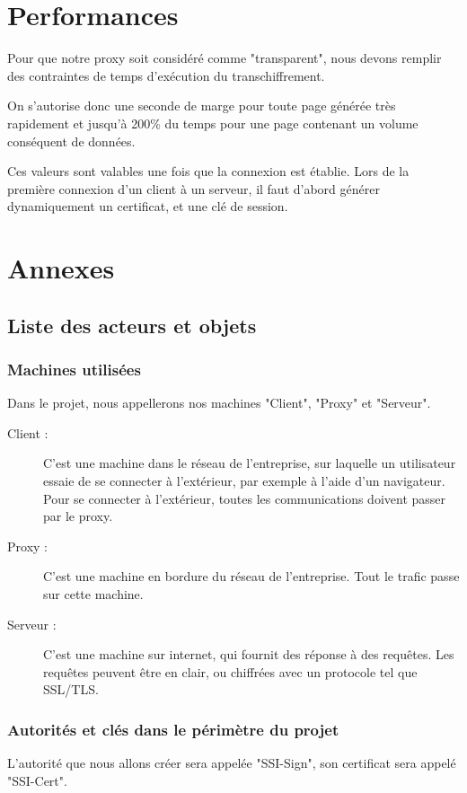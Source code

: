 \documentclass[a4paper,11pt,french]{article}
\begin{document}
\section{Performances}
Pour que notre proxy soit considéré comme "transparent", nous devons remplir des contraintes de temps d'exécution du transchiffrement.

On s'autorise donc une seconde de marge pour toute page générée très rapidement et jusqu'à 200\% du temps pour une page contenant un volume conséquent de données.

Ces valeurs sont valables une fois que la connexion est établie. Lors de la première connexion d'un client à un serveur, il faut d'abord générer dynamiquement un certificat, et une clé de session.

\newpage
\section{Annexes}


\subsection{Liste des acteurs et objets}

\subsubsection{Machines utilisées}
Dans le projet, nous appellerons nos machines "Client", "Proxy" et "Serveur".
\begin{description}
\item[Client :] C'est une machine dans le réseau de l'entreprise, sur laquelle un utilisateur essaie de se connecter à l'extérieur, par exemple à l'aide d'un navigateur. Pour se connecter à l'extérieur, toutes les communications doivent passer par le proxy.
\item[Proxy :] C'est une machine en bordure du réseau de l'entreprise. Tout le trafic passe sur cette machine.
\item[Serveur :] C'est une machine sur internet, qui fournit des réponse à des requêtes. Les requêtes peuvent être en clair, ou chiffrées avec un protocole tel que SSL/TLS.
\end{description}





\subsubsection{Autorités et clés dans le périmètre du projet}
L'autorité que nous allons créer sera appelée "SSI-Sign", son certificat sera appelé "SSI-Cert".
\end{document}
